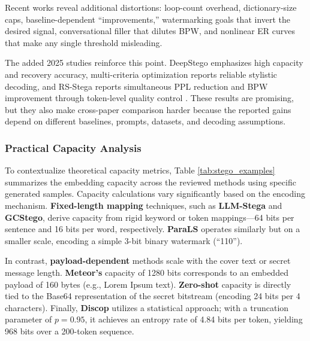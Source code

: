 Recent works reveal additional distortions: loop-count overhead, dictionary-size caps, baseline-dependent “improvements,” watermarking goals that invert the desired signal, conversational filler that dilutes BPW, and nonlinear ER curves that make any single threshold misleading.

The added 2025 studies reinforce this point. DeepStego emphasizes high capacity and recovery accuracy, multi-criteria optimization reports reliable stylistic decoding, and RS-Stega reports simultaneous PPL reduction and BPW improvement through token-level quality control \cite{kuznetsov2025deepstego,wozniak2025multicriteria,wang2025rsstega}. These results are promising, but they also make cross-paper comparison harder because the reported gains depend on different baselines, prompts, datasets, and decoding assumptions.


\subsubsection{Practical Capacity Analysis}

To contextualize theoretical capacity metrics, Table \ref{tab:stego_examples} summarizes the embedding capacity across the reviewed methods using specific generated samples. Capacity calculations vary significantly based on the encoding mechanism. \textbf{Fixed-length mapping} techniques, such as \textbf{LLM-Stega} and \textbf{GCStego}, derive capacity from rigid keyword or token mappings---64 bits per sentence and 16 bits per word, respectively. \textbf{ParaLS} operates similarly but on a smaller scale, encoding a simple 3-bit binary watermark (``110'').

In contrast, \textbf{payload-dependent} methods scale with the cover text or secret message length. \textbf{Meteor's} capacity of 1280 bits corresponds to an embedded payload of 160 bytes (e.g., Lorem Ipsum text). \textbf{Zero-shot} capacity is directly tied to the Base64 representation of the secret bitstream (encoding 24 bits per 4 characters). Finally, \textbf{Discop} utilizes a statistical approach; with a truncation parameter of $p=0.95$, it achieves an entropy rate of 4.84 bits per token, yielding 968 bits over a 200-token sequence.

